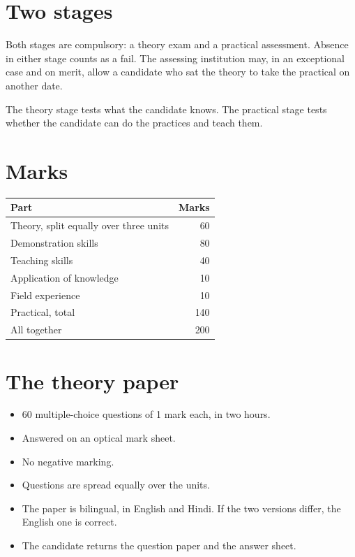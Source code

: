 \section*{Two stages}

Both stages are compulsory: a theory exam and a practical assessment. Absence in either stage counts as a fail. The assessing institution may, in an exceptional case and on merit, allow a candidate who sat the theory to take the practical on another date.

The theory stage tests what the candidate knows. The practical stage tests whether the candidate can do the practices and teach them.

\section*{Marks}

\begin{center}
\begin{tabular}{@{}lr@{}}
\toprule
Part & Marks \\
\midrule
Theory, split equally over three units & 60 \\
Demonstration skills & 80 \\
Teaching skills & 40 \\
Application of knowledge & 10 \\
Field experience & 10 \\
Practical, total & 140 \\
\midrule
All together & 200 \\
\bottomrule
\end{tabular}
\end{center}

\section*{The theory paper}

\begin{itemize}
\item 60 multiple-choice questions of 1 mark each, in two hours.
\item Answered on an optical mark sheet.
\item No negative marking.
\item Questions are spread equally over the units.
\item The paper is bilingual, in English and Hindi. If the two versions differ, the English one is correct.
\item The candidate returns the question paper and the answer sheet.
\end{itemize}


